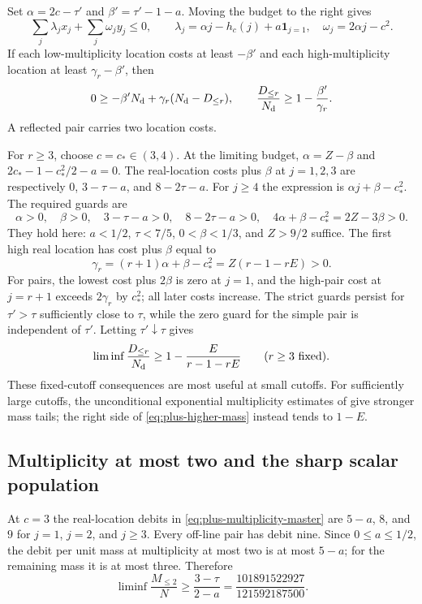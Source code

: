 \documentclass[11pt,reqno]{amsart}
\numberwithin{equation}{section}
\begin{document}
Set $\alpha=2c-\tau'$ and $\beta'=\tau'-1-a$. Moving the budget
to the right gives
\[
 \sum_j\lambda_jx_j+\sum_j\omega_jy_j\le0,\qquad
 \lambda_j=\alpha j-h_c(j)+a\mathbf1_{j=1},\quad
 \omega_j=2\alpha j-c^2.
\]
If each low-multiplicity location costs at least $-\beta'$ and each
high-multiplicity location at least $\gamma_r-\beta'$, then
\[
 0\ge-\beta'N_{\rm d}+\gamma_r(N_{\rm d}-D_{\le r}),
 \qquad
 \frac{D_{\le r}}{N_{\rm d}}\ge1-\frac{\beta'}{\gamma_r}.
\]
A reflected pair carries two location costs.

For $r\ge3$, choose $c=c_*\in(3,4)$. At the limiting budget,
$\alpha=Z-\beta$ and
$2c_*-1-c_*^2/2-a=0$. The real-location costs plus $\beta$ at
$j=1,2,3$ are respectively
$0$, $3-\tau-a$, and $8-2\tau-a$.
For $j\ge4$ the expression is $\alpha j+\beta-c_*^2$.
The required guards are
\[
 \alpha>0,\quad\beta>0,\quad
 3-\tau-a>0,\quad8-2\tau-a>0,\quad
 4\alpha+\beta-c_*^2=2Z-3\beta>0.
\]
They hold here: $a<1/2$, $\tau<7/5$, $0<\beta<1/3$, and
$Z>9/2$ suffice. The first high real location has cost plus $\beta$
equal to
\[
 \gamma_r=(r+1)\alpha+\beta-c_*^2
 =Z(r-1-rE)>0.
\]
For pairs, the lowest cost plus $2\beta$ is zero at $j=1$,
and the high-pair cost at $j=r+1$ exceeds $2\gamma_r$ by $c_*^2$;
all later costs increase. The strict guards persist for
$\tau'>\tau$ sufficiently close to $\tau$, while the zero guard
for the simple pair is independent of $\tau'$. Letting
$\tau'\downarrow\tau$ gives
\begin{equation}
 \liminf\frac{D_{\le r}}{N_{\rm d}}
 \ge1-\frac{E}{r-1-rE}\qquad(r\ge3\text{ fixed}).
 \label{eq:plus-higher-locations}
\end{equation}
These fixed-cutoff consequences are most useful at small cutoffs.
For sufficiently large cutoffs, the unconditional exponential
multiplicity estimates of \cite{STT} give stronger mass tails;
the right side of \eqref{eq:plus-higher-mass} instead tends to $1-E$.

\subsection{Multiplicity at most two and the sharp scalar population}

At $c=3$ the real-location debits in
\eqref{eq:plus-multiplicity-master} are $5-a$, $8$, and $9$ for
$j=1$, $j=2$, and $j\ge3$. Every off-line pair has debit nine.
Since $0\le a\le1/2$, the debit per unit mass at multiplicity at
most two is at most $5-a$; for the remaining mass it is at most
three. Therefore
\begin{equation}
 \liminf\frac{M_{\le2}}N
 \ge\frac{3-\tau}{2-a}
 =\frac{101891522927}{121592187500}.
 \label{eq:plus-mass-two}
\end{equation}
\end{document}
